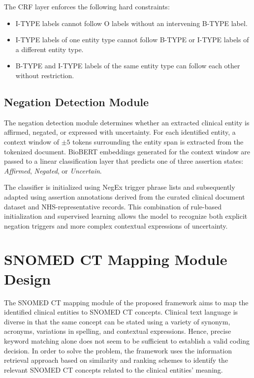 The CRF layer enforces the following hard constraints:
\begin{itemize}
    \item I-TYPE labels cannot follow O labels without an intervening B-TYPE label.
    \item I-TYPE labels of one entity type cannot follow B-TYPE or I-TYPE labels of a different entity type.
    \item B-TYPE and I-TYPE labels of the same entity type can follow each other without restriction.
\end{itemize}

\subsection{Negation Detection Module}

The negation detection module determines whether an extracted clinical entity is affirmed, negated, or expressed with uncertainty. For each identified entity, a context window of $\pm 5$ tokens surrounding the entity span is extracted from the tokenized document. BioBERT embeddings generated for the context window are passed to a linear classification layer that predicts one of three assertion states: \textit{Affirmed}, \textit{Negated}, or \textit{Uncertain}.

The classifier is initialized using NegEx trigger phrase lists and subsequently adapted using assertion annotations derived from the curated clinical document dataset and NHS-representative records. This combination of rule-based initialization and supervised learning allows the model to recognize both explicit negation triggers and more complex contextual expressions of uncertainty.

\section{SNOMED CT Mapping Module Design}

The SNOMED CT mapping module of the proposed framework aims to map the identified clinical entities to SNOMED CT concepts. Clinical text language is diverse in that the same concept can be stated using a variety of synonym, acronyms, variations in spelling, and contextual expressions. Hence, precise keyword matching alone does not seem to be sufficient to establish a valid coding decision. In order to solve the problem, the framework uses the information retrieval approach based on similarity and ranking schemes to identify the relevant SNOMED CT concepts related to the clinical entities' meaning.

